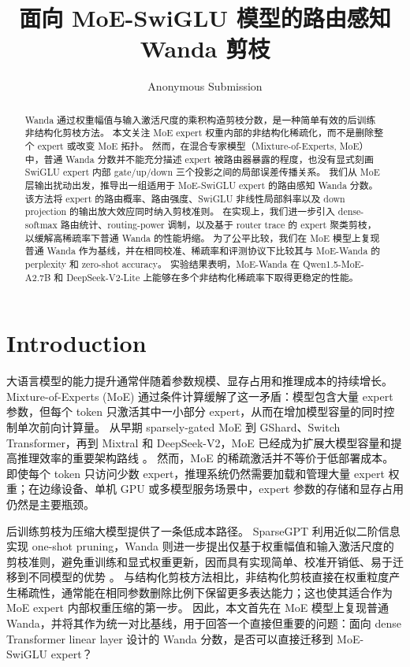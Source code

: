 \documentclass[letterpaper]{article}
\title{面向 MoE-SwiGLU 模型的路由感知 Wanda 剪枝}
\author{Anonymous Submission}
\newif\ifaaai
\begin{document}
\maketitle
\ifaaai\else\twocolumn\fi

\begin{abstract}
Wanda 通过权重幅值与输入激活尺度的乘积构造剪枝分数，是一种简单有效的后训练非结构化剪枝方法。
本文关注 MoE expert 权重内部的非结构化稀疏化，而不是删除整个 expert 或改变 MoE 拓扑。
然而，在混合专家模型（Mixture-of-Experts, MoE）中，普通 Wanda 分数并不能充分描述 expert 被路由器暴露的程度，也没有显式刻画 SwiGLU expert 内部 gate/up/down 三个投影之间的局部误差传播关系。
我们从 MoE 层输出扰动出发，推导出一组适用于 MoE-SwiGLU expert 的路由感知 Wanda 分数。
该方法将 expert 的路由概率、路由强度、SwiGLU 非线性局部斜率以及 down projection 的输出放大效应同时纳入剪枝准则。
在实现上，我们进一步引入 dense-softmax 路由统计、routing-power 调制，以及基于 router trace 的 expert 聚类剪枝，以缓解高稀疏率下普通 Wanda 的性能坍缩。
为了公平比较，我们在 MoE 模型上复现普通 Wanda 作为基线，并在相同校准、稀疏率和评测协议下比较其与 MoE-Wanda 的 perplexity 和 zero-shot accuracy。
实验结果表明，MoE-Wanda 在 Qwen1.5-MoE-A2.7B 和 DeepSeek-V2-Lite 上能够在多个非结构化稀疏率下取得更稳定的性能。
\end{abstract}

\section{Introduction}

大语言模型的能力提升通常伴随着参数规模、显存占用和推理成本的持续增长。
Mixture-of-Experts (MoE) 通过条件计算缓解了这一矛盾：模型包含大量 expert 参数，但每个 token 只激活其中一小部分 expert，从而在增加模型容量的同时控制单次前向计算量。
从早期 sparsely-gated MoE 到 GShard、Switch Transformer，再到 Mixtral 和 DeepSeek-V2，MoE 已经成为扩展大模型容量和提高推理效率的重要架构路线 \cite{shazeer2017outrageously,lepikhin2020gshard,fedus2021switch,jiang2024mixtral,deepseekv2}。
然而，MoE 的稀疏激活并不等价于低部署成本。
即使每个 token 只访问少数 expert，推理系统仍然需要加载和管理大量 expert 权重；在边缘设备、单机 GPU 或多模型服务场景中，expert 参数的存储和显存占用仍然是主要瓶颈。

后训练剪枝为压缩大模型提供了一条低成本路径。
SparseGPT 利用近似二阶信息实现 one-shot pruning，Wanda 则进一步提出仅基于权重幅值和输入激活尺度的剪枝准则，避免重训练和显式权重更新，因而具有实现简单、校准开销低、易于迁移到不同模型的优势 \cite{frantar2023sparsegpt,sun2023wanda}。
与结构化剪枝方法相比，非结构化剪枝直接在权重粒度产生稀疏性，通常能在相同参数删除比例下保留更多表达能力；这也使其适合作为 MoE expert 内部权重压缩的第一步。
因此，本文首先在 MoE 模型上复现普通 Wanda，并将其作为统一对比基线，用于回答一个直接但重要的问题：面向 dense Transformer linear layer 设计的 Wanda 分数，是否可以直接迁移到 MoE-SwiGLU expert？
\end{document}
